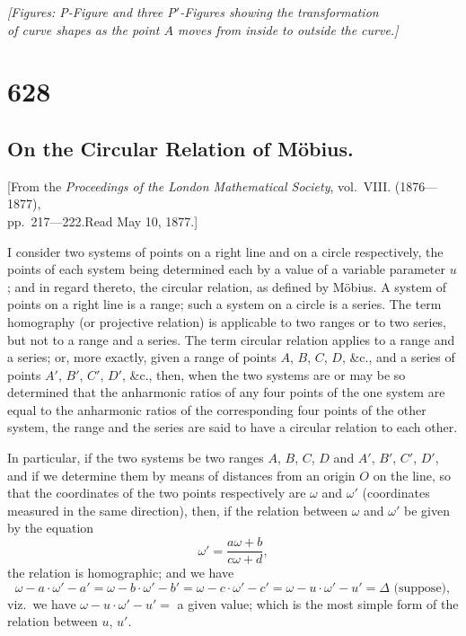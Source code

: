 \documentclass[12pt,a4paper]{article}
\begin{document}
\begin{center}
\textit{[Figures: P-Figure and three P$'$-Figures showing the transformation\\
of curve shapes as the point $A$ moves from inside to outside the curve.]}
\end{center}

\newpage

\section*{628}
\subsection*{On the Circular Relation of M\"obius.}

\begin{center}
\small
[From the \textit{Proceedings of the London Mathematical Society}, vol.~VIII. (1876---1877),\\
pp.~217---222.\quad Read May 10, 1877.]
\end{center}

\medskip
\noindent
I consider two systems of points on a right line and on a circle respectively, the points of each system being determined each by a value of a variable parameter $u$; and in regard thereto, the circular relation, as defined by M\"obius. A system of points on a right line is a range; such a system on a circle is a series. The term homography (or projective relation) is applicable to two ranges or to two series, but not to a range and a series. The term circular relation applies to a range and a series; or, more exactly, given a range of points $A$, $B$, $C$, $D$, \&c., and a series of points $A'$, $B'$, $C'$, $D'$, \&c., then, when the two systems are or may be so determined that the anharmonic ratios of any four points of the one system are equal to the anharmonic ratios of the corresponding four points of the other system, the range and the series are said to have a circular relation to each other.

In particular, if the two systems be two ranges $A$, $B$, $C$, $D$ and $A'$, $B'$, $C'$, $D'$, and if we determine them by means of distances from an origin $O$ on the line, so that the coordinates of the two points respectively are $\omega$ and $\omega'$ (coordinates measured in the same direction), then, if the relation between $\omega$ and $\omega'$ be given by the equation
\[
\omega' = \frac{a\omega + b}{c\omega + d},
\]
the relation is homographic; and we have
\[
\omega - a \cdot \omega' - a' = \omega - b \cdot \omega' - b' = \omega - c \cdot \omega' - c' = \omega - u \cdot \omega' - u' = \Delta \text{ (suppose)},
\]
viz.\ we have $\omega - u \cdot \omega' - u' = $ a given value; which is the most simple form of the relation between $u$, $u'$.
\end{document}
